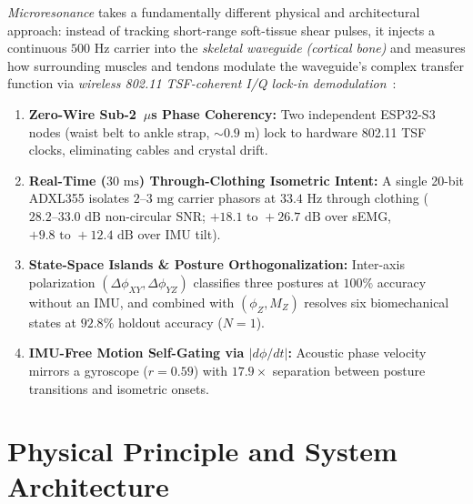 \documentclass[conference]{IEEEtran}
\begin{document}
\textit{Microresonance} takes a fundamentally different physical and architectural approach: instead of tracking short-range soft-tissue shear pulses, it injects a continuous $500\text{ Hz}$ carrier into the \textit{skeletal waveguide (cortical bone)} and measures how surrounding muscles and tendons modulate the waveguide's complex transfer function via \textit{wireless 802.11 TSF-coherent I/Q lock-in demodulation}~\cite{ieee80211}:
\begin{enumerate}
    \item \textbf{Zero-Wire Sub-2~$\mu$s Phase Coherency:} Two independent ESP32-S3 nodes (waist belt to ankle strap, $\sim 0.9\text{ m}$) lock to hardware 802.11 TSF clocks, eliminating cables and crystal drift.
    \item \textbf{Real-Time ($30\text{ ms}$) Through-Clothing Isometric Intent:} A single 20-bit ADXL355 isolates $2\text{--}3\text{ mg}$ carrier phasors at $33.4\text{ Hz}$ through clothing ($28.2\text{--}33.0\text{ dB}$ non-circular SNR; $+18.1\text{ to }+26.7\text{ dB}$ over sEMG, $+9.8\text{ to }+12.4\text{ dB}$ over IMU tilt).
    \item \textbf{State-Space Islands \& Posture Orthogonalization:} Inter-axis polarization $(\Delta\phi_{XY}, \Delta\phi_{YZ})$ classifies three postures at $100\%$ accuracy without an IMU, and combined with $(\phi_Z, M_Z)$ resolves six biomechanical states at $92.8\%$ holdout accuracy ($N=1$).
    \item \textbf{IMU-Free Motion Self-Gating via $|d\phi/dt|$:} Acoustic phase velocity mirrors a gyroscope ($r = 0.59$) with $17.9\times$ separation between posture transitions and isometric onsets.
\end{enumerate}

\section{Physical Principle and System Architecture}
\end{document}
